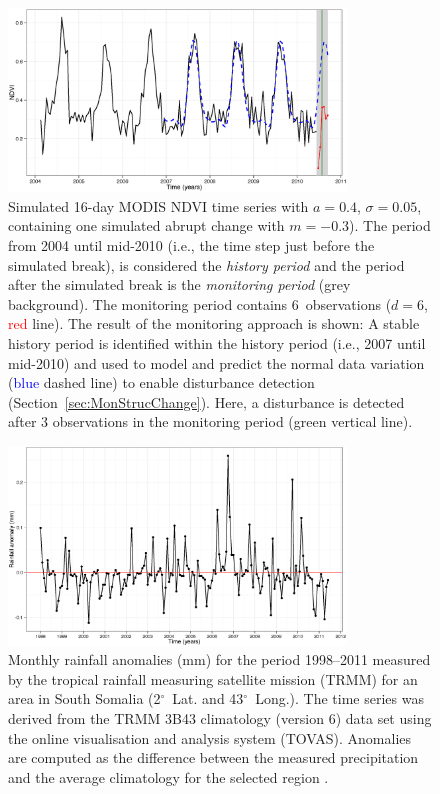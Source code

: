 \documentclass[authoryear,preprint,review,10pt]{elsarticle}
\newcommand{\degree}{\ensuremath{^\circ}}
\begin{document}
 \begin{figure}[htp]
\centering
    \includegraphics[width=0.8\textwidth]{figs/Fig1_Sim_Monitoring_ggplot.eps}
  \caption{Simulated 16-day MODIS NDVI time series with $a = 0.4$, $\sigma = 0.05$, containing one simulated abrupt change with $m = -0.3$). The period from 2004 until mid-2010 (i.e., the time step just before the simulated break), is considered the \emph{history period} and the period after the simulated break is the \emph{monitoring period} (grey background). The monitoring period contains 6~observations ($d = 6$, \textcolor{red} {red} line). The result of the monitoring approach is shown: A stable history period is identified within the history period (i.e., 2007 until mid-2010) and used to model and predict the normal data variation (\textcolor{blue} {blue} dashed line) to enable disturbance detection (Section~\ref{sec:MonStrucChange}).  Here, a disturbance is detected after 3 observations in the monitoring period (\textcolor{OliveGreen} {green} vertical line).}
  \label{fig:SimMonitor}
\end{figure}

 \begin{figure}[htp]
\centering
    \includegraphics[width=0.8\textwidth]{figs/Fig2_RainfallAnomaly.eps}
  \caption{Monthly rainfall anomalies (mm) for the period 1998--2011 measured by the tropical rainfall measuring satellite mission (TRMM) for an area in South Somalia (2\degree~Lat. and 43\degree~Long.). The time series was derived from the TRMM 3B43 climatology (version 6) data set using the online visualisation and analysis system (TOVAS). Anomalies are computed as the difference between the measured precipitation and the average climatology for the selected region \citep{Acker:2007vk}.}
  \label{fig:RF}
\end{figure}
\end{document}
